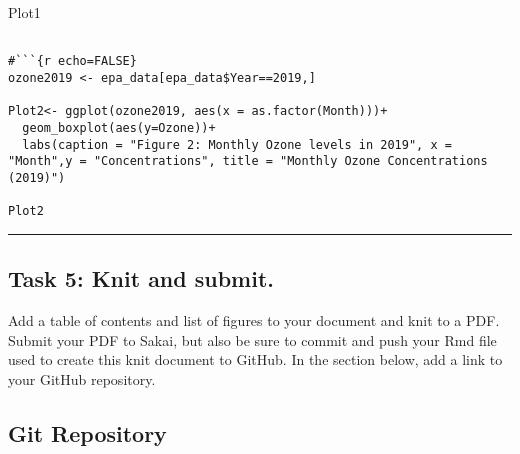 \documentclass[
]{article}
\begin{document}
Plot1

\begin{verbatim}

#```{r echo=FALSE}
ozone2019 <- epa_data[epa_data$Year==2019,]

Plot2<- ggplot(ozone2019, aes(x = as.factor(Month)))+
  geom_boxplot(aes(y=Ozone))+
  labs(caption = "Figure 2: Monthly Ozone levels in 2019", x = "Month",y = "Concentrations", title = "Monthly Ozone Concentrations (2019)")

Plot2
\end{verbatim}

\begin{center}\rule{0.5\linewidth}{0.5pt}\end{center}

\newpage

\subsection{Task 5: Knit and submit.}\label{task-5-knit-and-submit.}

Add a table of contents and list of figures to your document and knit to
a PDF. Submit your PDF to Sakai, but also be sure to commit and push
your Rmd file used to create this knit document to GitHub. In the
section below, add a link to your GitHub repository.

\subsection{Git Repository}\label{git-repository}
\end{document}
